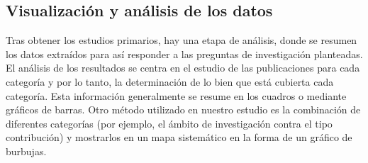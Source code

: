 \subsection{Visualización y análisis de los datos}
Tras obtener los estudios primarios, hay una etapa de análisis, donde se resumen los datos extraídos para así responder a las preguntas de investigación planteadas.
El análisis de los resultados se centra en el estudio de las publicaciones para cada categoría y por lo tanto, la determinación de lo bien que está cubierta cada categoría. Esta información generalmente se resume en los cuadros o mediante gráficos de barras. Otro método utilizado en nuestro estudio es la combinación de diferentes categorías (por ejemplo, el ámbito de investigación contra el tipo contribución) y mostrarlos en un mapa sistemático en la forma de un gráfico de burbujas.



